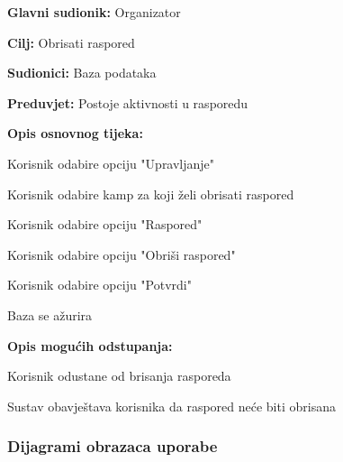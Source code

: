 					\noindent {}
					\begin{packed_item}
						
						\item \textbf{Glavni sudionik: } Organizator
						\item  \textbf{Cilj:} Obrisati raspored
						\item  \textbf{Sudionici:} Baza podataka
						\item  \textbf{Preduvjet:} Postoje aktivnosti u rasporedu	
						\item  \textbf{Opis osnovnog tijeka:}
						\item[] \begin{packed_enum}
							
							\item Korisnik odabire opciju "Upravljanje"
							\item Korisnik odabire kamp za koji želi obrisati raspored
							\item Korisnik odabire opciju "Raspored"
							\item Korisnik odabire opciju "Obriši raspored"
							\item Korisnik odabire opciju "Potvrdi"
							\item Baza se ažurira
						\end{packed_enum}
						
						\item  \textbf{Opis mogućih odstupanja:}
						
						\item[] \begin{packed_item}
							
							\item[2.a] Korisnik odustane od brisanja rasporeda
							\item[] \begin{packed_enum}
								
								\item Sustav obavještava korisnika da raspored neće biti obrisana

							\end{packed_enum}
						\end{packed_item}
					\end{packed_item}
				
					
					
				\subsubsection{Dijagrami obrazaca uporabe}
					
